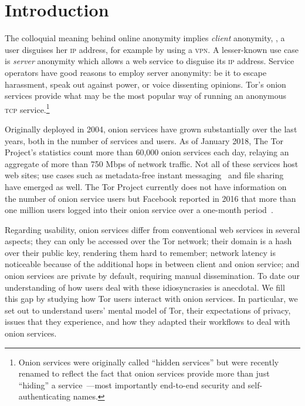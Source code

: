 \section{Introduction}
\label{sec:introduction}

The colloquial meaning behind online anonymity implies \emph{client} anonymity,
\ie, a user disguises her \textsc{ip} address, for example by using a
\textsc{vpn}.  A lesser-known use case is \emph{server} anonymity which allows a
web service to disguise its \textsc{ip} address.  Service operators have good
reasons to employ server anonymity: be it to escape harassment, speak out
against power, or voice dissenting opinions.  Tor's onion services provide what
may be the most popular way of running an anonymous \textsc{tcp}
service.\footnote{Onion services were originally called ``hidden services'' but
were recently renamed to reflect the fact that onion services provide more than
just ``hiding'' a service~\cite{Johnson2015a}---most importantly end-to-end
security and self-authenticating names.}

Originally deployed in 2004, onion services have grown substantially over the
last years, both in the number of services and users.  As of January 2018, The
Tor Project's statistics count more than 60,000 onion services each day,
relaying an aggregate of more than 750 Mbps of network traffic.  Not all of
these services host web sites; use cases such as metadata-free instant
messaging~\cite{ricochet} and file sharing~\cite{onionshare} have emerged as
well.  The Tor Project currently does not have information on the number of
onion service users but Facebook reported in 2016 that more than one million
users logged into their onion service over a one-month
period~\cite{facebook-users}.

Regarding usability, onion services differ from conventional web services in
several aspects; \first they can only be accessed over the Tor network; \second
their domain is a hash over their public key, rendering them hard to remember;
\third network latency is noticeable because of the additional hops in between
client and onion service; and \fourth onion services are private by default,
requiring manual dissemination.  To date our understanding of how users deal
with these idiosyncrasies is anecdotal.  We fill this gap by studying how Tor
users interact with onion services.  In particular, we set out to understand
users' mental model of Tor, their expectations of privacy, issues that they
experience, and how they adapted their workflows to deal with onion services.

